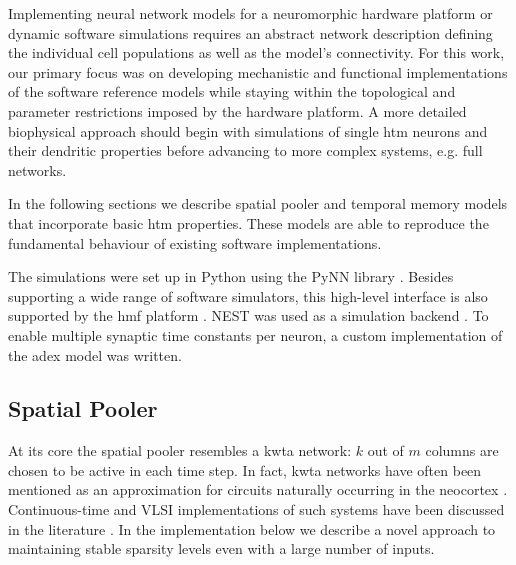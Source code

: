 Implementing neural network models for a neuromorphic hardware platform or
dynamic software simulations requires an abstract network description defining
the individual cell populations as well as the model's connectivity. For this
work, our primary focus was on developing mechanistic and functional
implementations of the software reference models while staying within the
topological and parameter restrictions imposed by the hardware platform.
A more detailed biophysical approach should begin with simulations of single
\gls{htm} neurons and their dendritic properties before advancing to more
complex systems, e.g. full networks.

In the following sections we describe spatial pooler and temporal memory
models that incorporate basic \gls{htm} properties. These models are able to
reproduce the fundamental behaviour of existing software implementations.

The simulations were set up in Python using the PyNN library \citep{davison2008pynn}. Besides supporting a wide range of software simulators, this high-level interface is also supported by the \gls{hmf} platform \citep{billaudelle14pyhmf}. NEST was used as a simulation backend \citep{gewaltig2007nest}. To enable multiple synaptic time constants per neuron, a custom implementation of the \gls{adex} model was written.

\subsection{Spatial Pooler}
\label{sss:spatial_pooler_network}

At its core the spatial pooler resembles a \gls{kwta}
network: $k$ out of $m$ columns are chosen to be active in each time step. In
fact, \gls{kwta} networks have often been mentioned as an approximation for
circuits naturally occurring in the neocortex \citep{felch2008hypergeometric}.
Continuous-time and VLSI implementations of such systems have been discussed
in the literature \citep{erlanson1991analog,tymoshchuk2012,maass2000neural}.
In the implementation below we describe a novel approach to maintaining
stable sparsity levels even with a large number of inputs.

